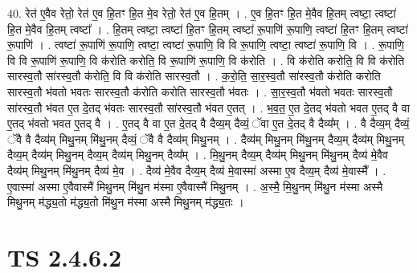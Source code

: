 \documentclass[17pt]{extarticle}
\begin{document}
40. रेत॑ ए॒वैव रेतो॒ रेत॑ ए॒व हि॒तꣳ हि॒त मे॒व रेतो॒ रेत॑ ए॒व हि॒तम् । . ए॒व हि॒तꣳ हि॒त मे॒वैव हि॒तम् त्वष्टा॒ त्वष्टा॑ हि॒त मे॒वैव हि॒तम् त्वष्टा᳚ । . हि॒तम् त्वष्टा॒ त्वष्टा॑ हि॒तꣳ हि॒तम् त्वष्टा॑ रू॒पाणि॑ रू॒पाणि॒ त्वष्टा॑ हि॒तꣳ हि॒तम् त्वष्टा॑ रू॒पाणि॑ । . त्वष्टा॑ रू॒पाणि॑ रू॒पाणि॒ त्वष्टा॒ त्वष्टा॑ रू॒पाणि॒ वि वि रू॒पाणि॒ त्वष्टा॒ त्वष्टा॑ रू॒पाणि॒ वि । . रू॒पाणि॒ वि वि रू॒पाणि॑ रू॒पाणि॒ वि क॑रोति करोति॒ वि रू॒पाणि॑ रू॒पाणि॒ वि क॑रोति । . वि क॑रोति करोति॒ वि वि क॑रोति सारस्व॒तौ सा॑रस्व॒तौ क॑रोति॒ वि वि क॑रोति सारस्व॒तौ । . क॒रो॒ति॒ सा॒र॒स्व॒तौ सा॑रस्व॒तौ क॑रोति करोति सारस्व॒तौ भ॑वतो भवतः सारस्व॒तौ क॑रोति करोति सारस्व॒तौ भ॑वतः । . सा॒र॒स्व॒तौ भ॑वतो भवतः सारस्व॒तौ सा॑रस्व॒तौ भ॑वत ए॒त दे॒तद् भ॑वतः सारस्व॒तौ सा॑रस्व॒तौ भ॑वत ए॒तत् । . भ॒व॒त॒ ए॒त दे॒तद् भ॑वतो भवत ए॒तद् वै वा ए॒तद् भ॑वतो भवत ए॒तद् वै । . ए॒तद् वै वा ए॒त दे॒तद् वै दैव्य॒म् दैव्यं॒ ॅवा ए॒त दे॒तद् वै दैव्य᳚म् । . वै दैव्य॒म् दैव्यं॒ ॅवै वै दैव्य॑म् मिथु॒नम् मि॑थु॒नम् दैव्यं॒ ॅवै वै दैव्य॑म् मिथु॒नम् । . दैव्य॑म् मिथु॒नम् मि॑थु॒नम् दैव्य॒म् दैव्य॑म् मिथु॒नम् दैव्य॒म् दैव्य॑म् मिथु॒नम् दैव्य॒म् दैव्य॑म् मिथु॒नम् दैव्य᳚म् । . मि॒थु॒नम् दैव्य॒म् दैव्य॑म् मिथु॒नम् मि॑थु॒नम् दैव्य॑ मे॒वैव दैव्य॑म् मिथु॒नम् मि॑थु॒नम् दैव्य॑ मे॒व । . दैव्य॑ मे॒वैव दैव्य॒म् दैव्य॑ मे॒वास्मा॑ अस्मा ए॒व दैव्य॒म् दैव्य॑ मे॒वास्मै᳚ । . ए॒वास्मा॑ अस्मा ए॒वैवास्मै॑ मिथु॒नम् मि॑थु॒न म॑स्मा ए॒वैवास्मै॑ मिथु॒नम् । . अ॒स्मै॒ मि॒थु॒नम् मि॑थु॒न म॑स्मा अस्मै मिथु॒नम् म॑द्ध्य॒तो म॑द्ध्य॒तो मि॑थु॒न म॑स्मा अस्मै मिथु॒नम् म॑द्ध्य॒तः । \newline
\pagebreak
{}
\section*{ TS 2.4.6.2 }
\end{document}
